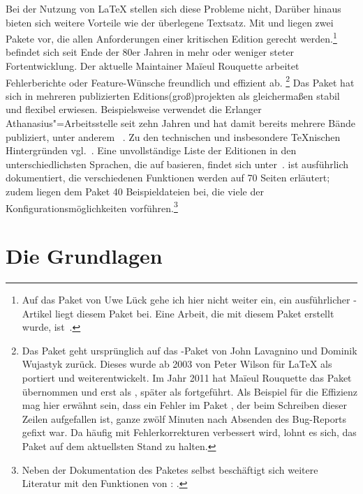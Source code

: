 Bei der Nutzung von \LaTeX{} stellen sich diese Probleme nicht, Darüber hinaus bieten sich 
weitere Vorteile wie der überlegene Textsatz. Mit  und \reledmac 
liegen zwei Pakete vor, die allen Anforderungen einer kritischen Edition gerecht 
werden.\footnote{Auf das Paket  von Uwe Lück gehe ich 
hier nicht weiter ein, ein ausführlicher \TUGboat-Artikel liegt diesem Paket bei. 
Eine Arbeit, die mit diesem Paket erstellt wurde, ist~\cite{mariev:joh_ant}.} 
\reledmac befindet sich seit Ende der 80er Jahren in mehr oder weniger steter Fortentwicklung. 
Der aktuelle Maintainer Maïeul Rouquette arbeitet Fehlerberichte oder Feature-Wünsche 
freundlich und effizient ab.%
\footnote{%
	Das Paket \reledmac geht 
	ursprünglich auf das \plainTeX{}-Paket  von John Lavagnino und 
	Dominik Wujastyk zurück. Dieses wurde ab 2003 von Peter Wilson für \LaTeX{} 
	als  portiert und weiterentwickelt. Im Jahr 2011 hat Maïeul 
	Rouquette das Paket übernommen und erst als , später als \reledmac fortgeführt. 
	Als Beispiel für die Effizienz mag hier erwähnt sein, dass ein Fehler im Paket 
	\reledmac, der beim Schreiben dieser Zeilen aufgefallen ist, ganze zwölf Minuten nach 
	Absenden des Bug-Reports gefixt war.
	Da \reledmac häufig mit Fehlerkorrekturen verbessert wird, lohnt es sich, das Paket auf dem aktuellsten Stand zu halten.}
Das Paket hat sich in mehreren publizierten 
Editions(groß)projekten als gleichermaßen stabil und flexibel erwiesen. %
Beispielsweise verwendet die Erlanger Athanasius"=Arbeitsstelle %
seit zehn Jahren 
 und hat damit bereits mehrere Bände publiziert, unter anderem%
~\cite{athanasius_3_1_4}. Zu den technischen und insbesondere \TeX{}nischen 
Hintergründen vgl.~\cite{stockhausen:mde2016/2}. Eine unvollständige Liste der Editionen in den unterschiedlichsten 
Sprachen, die auf  basieren, findet sich unter~\cite{reledmac-benutzung}. 
\reledmac ist 
ausführlich dokumentiert, die verschiedenen Funktionen werden auf 70 Seiten 
erläutert; zudem liegen dem Paket 40 Beispieldateien bei, die viele der 
Konfigurationsmöglichkeiten vorführen.\footnote{Neben der Dokumentation des Paketes selbst beschäftigt sich weitere Literatur mit den Funktionen von : \cite{reledmac-literatur}.}


\section{Die Grundlagen}\label{apparate-grundlagen-anfang}

